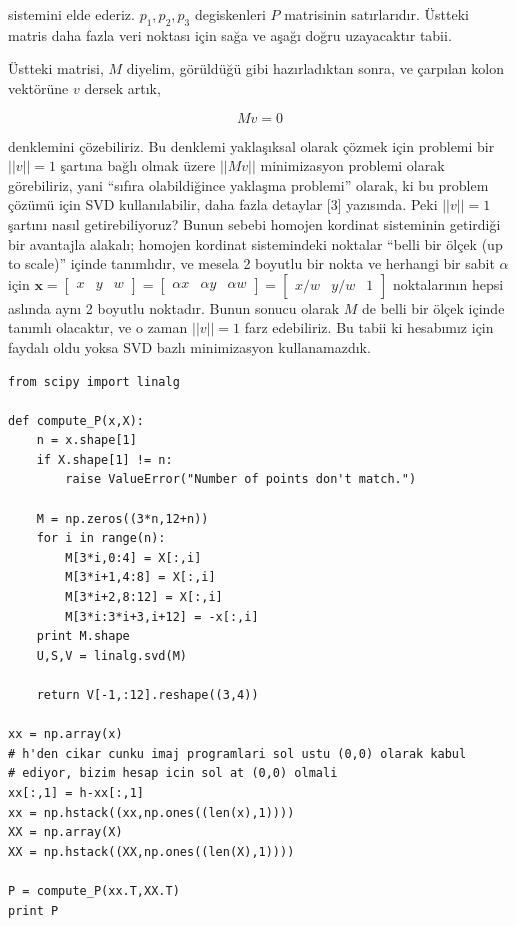 \documentclass[12pt,fleqn]{article}\usepackage{../../common}
\begin{document}
sistemini elde ederiz. $p_1,p_2,p_3$ degiskenleri $P$ matrisinin
satırlarıdır. Üstteki matris daha fazla veri noktası için sağa ve aşağı
doğru uzayacaktır tabii.

Üstteki matrisi, $M$ diyelim, görüldüğü gibi hazırladıktan sonra, ve
çarpılan kolon vektörüne $v$ dersek artık,

$$ Mv = 0$$ 

denklemini çözebiliriz. Bu denklemi yaklaşıksal olarak çözmek için problemi
bir $||v||=1$ şartına bağlı olmak üzere $||Mv||$ minimizasyon problemi
olarak görebiliriz, yani ``sıfıra olabildiğince yaklaşma problemi'' olarak,
ki bu problem çözümü için SVD kullanılabilir, daha fazla detaylar [3]
yazısında. Peki $||v||=1$ şartını nasıl getirebiliyoruz? Bunun sebebi
homojen kordinat sisteminin getirdiği bir avantajla alakalı; homojen
kordinat sistemindeki noktalar ``belli bir ölçek (up to scale)'' içinde
tanımlıdır, ve mesela 2 boyutlu bir nokta ve herhangi bir sabit $\alpha$
için
$\mathbf{x} = \left[\begin{array}{ccc}x&y&w\end{array}\right] =
\left[\begin{array}{ccc}\alpha x& \alpha y& \alpha w\end{array}\right] =
\left[\begin{array}{ccc}x/w&y/w&1\end{array}\right]$
noktalarının hepsi aslında aynı 2 boyutlu noktadır. Bunun sonucu olarak $M$
de belli bir ölçek içinde tanımlı olacaktır, ve o zaman $||v|| = 1$ farz
edebiliriz. Bu tabii ki hesabımız için faydalı oldu yoksa SVD bazlı
minimizasyon kullanamazdık.

\begin{verbatim}
from scipy import linalg

def compute_P(x,X):
    n = x.shape[1]
    if X.shape[1] != n:
        raise ValueError("Number of points don't match.")
        
    M = np.zeros((3*n,12+n))
    for i in range(n):
        M[3*i,0:4] = X[:,i]
        M[3*i+1,4:8] = X[:,i]
        M[3*i+2,8:12] = X[:,i]
        M[3*i:3*i+3,i+12] = -x[:,i]
    print M.shape
    U,S,V = linalg.svd(M)
    
    return V[-1,:12].reshape((3,4))

xx = np.array(x)
# h'den cikar cunku imaj programlari sol ustu (0,0) olarak kabul 
# ediyor, bizim hesap icin sol at (0,0) olmali
xx[:,1] = h-xx[:,1] 
xx = np.hstack((xx,np.ones((len(x),1))))
XX = np.array(X)
XX = np.hstack((XX,np.ones((len(X),1))))

P = compute_P(xx.T,XX.T)
print P
\end{verbatim}
\end{document}
